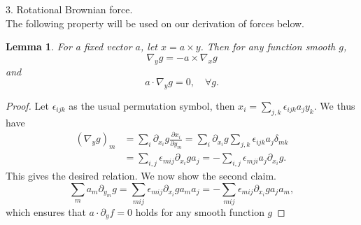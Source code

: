 \documentclass[reqno]{amsart}
\numberwithin{equation}{section}
\newtheorem{Lemma}{Lemma}[section]
\theoremstyle{definition}
\theoremstyle{remark}
\begin{document}
3. Rotational Brownian force. \\
The following property will be used on our derivation of forces
below.
\begin{Lemma} \label{lem3.1} For a fixed vector $a$, let $x=a\times y$. Then for
any function smooth $g$,
$$
\nabla_y g=-a\times \nabla_x g
$$
and
$$
a\cdot \nabla_y g=0, \quad \forall g.
$$
\end{Lemma}
\begin{proof}Let $\epsilon_{ijk}$  as the usual permutation symbol,
then $x_i=\sum_{j,k}\epsilon_{ijk} a_jy_k$.  We thus have
\begin{align*}
(\nabla_y g)_m &=\sum_i \partial_{x_i}g \frac{\partial x_i
}{\partial y_m}=\sum_i \partial_{x_i}g
\sum_{j,k}\epsilon_{ijk}a_j\delta_{mk}\\
&=\sum_{i,j}\epsilon_{mij}\partial_{x_i}g
a_j=-\sum_{i,j}\epsilon_{mji}a_j \partial_{x_i}g.
\end{align*}
This gives the desired relation. We now show the second claim.
$$
\sum_{m}a_m\partial_{y_m}g= \sum_{mij}\epsilon_{mij}\partial_{x_i}g
a_m a_j=-\sum_{mij}\epsilon_{mij}\partial_{x_i}g a_j a_m,
$$
which ensures that $a\cdot \partial_y f=0$ holds for any smooth
function $g$


\end{proof}
\end{document}
